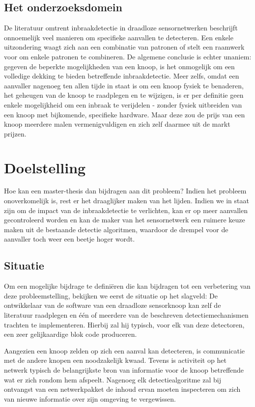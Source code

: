 \documentclass[12pt,a4paper,draft]{article}
\begin{document}
\subsection*{Het onderzoeksdomein}

De literatuur omtrent inbraakdetectie in draadloze sensornetwerken beschrijft
onnoemelijk veel manieren om specifieke aanvallen te detecteren. Een enkele
uitzondering waagt zich aan een combinatie van patronen of stelt een raamwerk
voor om enkele patronen te combineren. De algemene conclusie is echter unaniem:
gegeven de beperkte mogelijkheden van een knoop, is het onmogelijk om een
volledige dekking te bieden betreffende inbraakdetectie. Meer zelfs, omdat een
aanvaller nagenoeg ten allen tijde in staat is om een knoop fysiek te
benaderen, het geheugen van de knoop te raadplegen en te wijzigen, is er per
definitie geen enkele mogelijkheid om een inbraak te verijdelen - zonder fysiek
uitbreiden van een knoop met bijkomende, specifieke hardware. Maar deze zou de
prijs van een knoop meerdere malen vermenigvuldigen en zich zelf daarmee uit de
markt prijzen.

\section*{Doelstelling}

Hoe kan een master-thesis dan bijdragen aan dit probleem? Indien het probleem
onoverkomelijk is, rest er het draaglijker maken van het lijden. Indien we in
staat zijn om de impact van de inbraakdetectie te verlichten, kan er op meer
aanvallen gecontroleerd worden en kan de maker van het sensornetwerk een
ruimere keuze maken uit de bestaande detectie algoritmen, waardoor de drempel
voor de aanvaller toch weer een beetje hoger wordt.

\subsection*{Situatie}

Om een mogelijke bijdrage te defini\"eren die kan bijdragen tot een verbetering
van deze probleemstelling, bekijken we eerst de situatie op het slagveld: De
ontwikkelaar van de software van een draadloze sensorknoop kan zelf de
literatuur raadplegen en \'e\'en of meerdere van de beschreven
detectiemechanismen trachten te implementeren. Hierbij zal hij typisch, voor
elk van deze detectoren, een zeer gelijkaardige blok code produceren.

Aangezien een knoop zelden op zich een aanval kan detecteren, is communicatie
met de andere knopen een noodzakelijk kwaad. Tevens is activiteit op het
netwerk typisch de belangrijkste bron van informatie voor de knoop betreffende
wat er zich rondom hem afspeelt. Nagenoeg elk detectiealgoritme zal bij
ontvangst van een netwerkpakket de inhoud ervan moeten inspecteren om zich van
nieuwe informatie over zijn omgeving te vergewissen.
\end{document}
